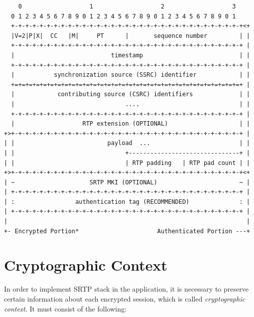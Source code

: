 \begin{verbatim}
    0                   1                   2                   3
  0 1 2 3 4 5 6 7 8 9 0 1 2 3 4 5 6 7 8 9 0 1 2 3 4 5 6 7 8 9 0 1
  +-+-+-+-+-+-+-+-+-+-+-+-+-+-+-+-+-+-+-+-+-+-+-+-+-+-+-+-+-+-+-+-+<+
  |V=2|P|X|  CC   |M|     PT      |       sequence number         | |
  +-+-+-+-+-+-+-+-+-+-+-+-+-+-+-+-+-+-+-+-+-+-+-+-+-+-+-+-+-+-+-+-+ |
  |                           timestamp                           | |
  +-+-+-+-+-+-+-+-+-+-+-+-+-+-+-+-+-+-+-+-+-+-+-+-+-+-+-+-+-+-+-+-+ |
  |           synchronization source (SSRC) identifier            | |
  +=+=+=+=+=+=+=+=+=+=+=+=+=+=+=+=+=+=+=+=+=+=+=+=+=+=+=+=+=+=+=+=+ |
  |            contributing source (CSRC) identifiers             | |
  |                               ....                            | |
  +-+-+-+-+-+-+-+-+-+-+-+-+-+-+-+-+-+-+-+-+-+-+-+-+-+-+-+-+-+-+-+-+ |
  |                   RTP extension (OPTIONAL)                    | |
+>+-+-+-+-+-+-+-+-+-+-+-+-+-+-+-+-+-+-+-+-+-+-+-+-+-+-+-+-+-+-+-+-+ |
| |                          payload  ...                         | |
| |                               +-------------------------------+ |
| |                               | RTP padding   | RTP pad count | |
+>+-+-+-+-+-+-+-+-+-+-+-+-+-+-+-+-+-+-+-+-+-+-+-+-+-+-+-+-+-+-+-+-+<+
| ~                     SRTP MKI (OPTIONAL)                       ~ |
| +-+-+-+-+-+-+-+-+-+-+-+-+-+-+-+-+-+-+-+-+-+-+-+-+-+-+-+-+-+-+-+-+ |
| :                 authentication tag (RECOMMENDED)              : |
| +-+-+-+-+-+-+-+-+-+-+-+-+-+-+-+-+-+-+-+-+-+-+-+-+-+-+-+-+-+-+-+-+ |
|                                                                   |
+- Encrypted Portion*                      Authenticated Portion ---+
\end{verbatim}

\section{Cryptographic Context}
In order to implement SRTP stack in the application, it is necessary to
preserve certain information about each encrypted session, which is 
called \textit{cryptographic context}. It must consist of the following:

